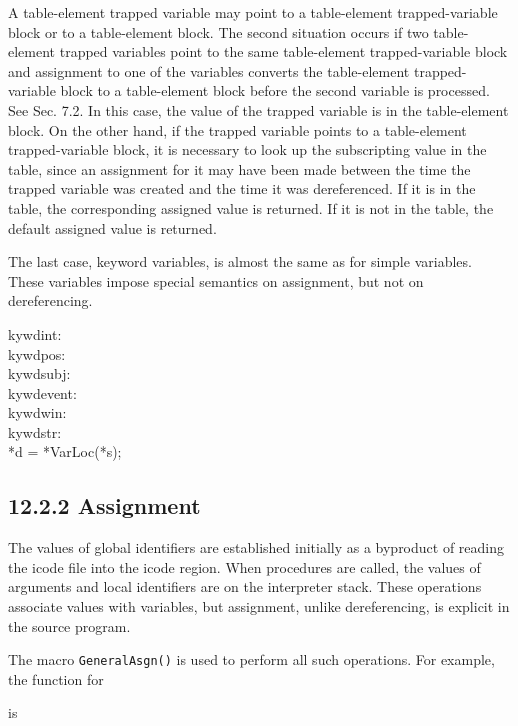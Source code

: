 A table-element trapped variable may point to a table-element
trapped-variable block or to a table-element block. The second
situation occurs if two table-element trapped variables point to the
same table-element trapped-variable block and assignment to one of the
variables converts the table-element trapped-variable block to a
table-element block before the second variable is processed. See
Sec. 7.2. In this case, the value of the trapped variable is in the
table-element block. On the other hand, if the trapped variable points
to a table-element trapped-variable block, it is necessary to look up
the subscripting value in the table, since an assignment for it may
have been made between the time the trapped variable was created and
the time it was dereferenced. If it is in the table, the corresponding
assigned value is returned. If it is not in the table, the default
assigned value is returned.

The last case, keyword variables, is almost the same as for
simple variables. These variables impose special semantics on
assignment, but not on dereferencing.

\begin{iconcode}
\>\>kywdint:\\
\>\>kywdpos:\\
\>\>kywdsubj:\\
\>\>kywdevent:\\
\>\>kywdwin:\\
\>\>kywdstr:\\
\>\>\>*d = *VarLoc(*s);
\end{iconcode}

\subsection[12.2.2 Assignment]{12.2.2 Assignment}

The values of global identifiers are established initially as a
byproduct of reading the icode file into the icode region. When
procedures are called, the values of arguments and local identifiers
are on the interpreter stack. These operations associate values with
variables, but assignment, unlike dereferencing, is explicit in the
source program.


The macro \texttt{GeneralAsgn()} is used to perform all such
operations. For example, the function for


is

